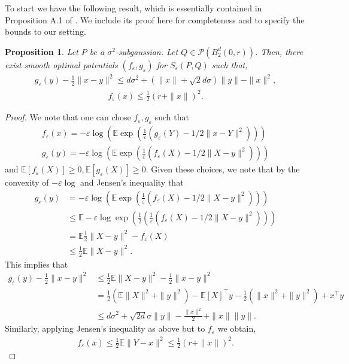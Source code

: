 \documentclass{article}
\newtheorem{proposition}{Proposition}
\theoremstyle{definition}
\newcommand{\feps}{f_\varepsilon}
\newcommand{\geps}{g_\varepsilon}
\begin{document}
To start we have the following result, which is essentially contained in Proposition A.1 of \cite{mena2019statistical}. We include its proof here for completeness and to specify the bounds to our setting.
\begin{proposition} 
\label{prop:mena_weed19} 
Let $P$ be a $\sigma^2$-subgaussian. Let $Q \in \mathcal{P}(B_2^d(0,r))$. Then, there exist smooth optimal potentials $(\feps, \geps)$ for $S_\varepsilon(P,Q)$ such that, 
\begin{align*}
    \geps(y) - \frac{1}{2}\| x - y \|^2 \leq d \sigma^2 + (\|x\| + \sqrt{2} d \sigma)\|y\| - \|x\|^2,
\end{align*}
\begin{align*}
    f_{\varepsilon}(x) \leq \frac{1}{2} ( r + \|x\|)^2.
\end{align*}
\end{proposition}
\begin{proof}
We note that one can chose $\feps, \geps$ such that 
\begin{align*}
    \feps(x) = - \varepsilon \log \left( \mathbb{E} \exp \left(  \frac{1}{\varepsilon}(\geps(Y) - 1/2 \| x - Y\|^2 )  \right) \right) \\
    \geps(y) = - \varepsilon \log \left( \mathbb{E} \exp \left(  \frac{1}{\varepsilon}(\feps(X) - 1/2 \| X - y\|^2 )  \right) \right) 
\end{align*}
and $\mathbb{E}[\feps(X)] \geq 0, \mathbb{E}[\geps(X)] \geq 0$. Given these choices, we note that by the convexity of $-\varepsilon \log$ and Jensen's inequality that
\begin{align*} 
    \geps(y)  &=  - \varepsilon \log \left( \mathbb{E} \exp \left(  \frac{1}{\varepsilon}(\feps(X) - 1/2 \| X - y\|^2 )  \right) \right)  \\
    &\leq \mathbb{E} -\varepsilon \log \exp \left ( \frac{1}{2} \left(  \frac{1}{\varepsilon}(\feps(X) - 1/2 \| X - y\|^2 )  \right) \right) \\
    &= \mathbb{E} \frac{1}{2}\|X - y\|^2 - \feps(X) \\
    &\leq \frac{1}{2}\mathbb{E} \|X - y\|^2.
\end{align*}
This implies that 
\begin{align*}
     \geps(y) - \frac{1}{2} \|x - y\|^2 & \leq \frac{1}{2} \mathbb{E} \|X - y\|^2 - \frac{1}{2} \|x - y\|^2\\
     & = \frac{1}{2} (\mathbb{E} \|X\|^2 +  \|y\|^2) - \mathbb{E}[X]^\top y - \frac{1}{2} (\|x\|^2 + \|y\|^2) + x^\top y\\
     & \leq d \sigma^2 + \sqrt{2 d} \sigma \|y\|  - \frac{\|x\|^2}{2} + \|x\| \|y\|.
\end{align*}
Similarly, applying Jensen's inequality as above but to $\feps$ we obtain, 
\begin{align*}
    \feps(x)  \leq \frac{1}{2} \mathbb{E} \|Y - x\|^2 \leq \frac{1}{2} (r + \|x\|)^2.
\end{align*}
\end{proof}
\end{document}

